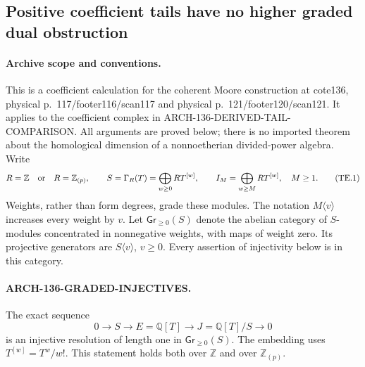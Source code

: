 \subsection{Positive coefficient tails have no higher graded dual obstruction}
\label{arch136:tail-ext}

\paragraph{Archive scope and conventions.}
This is a coefficient calculation for the coherent Moore construction
at cote136, physical p.~117/footer116/scan117 and physical
p.~121/footer120/scan121.  It applies to the coefficient complex in
ARCH-136-DERIVED-TAIL-COMPARISON.  All arguments are proved below;
there is no imported theorem about the homological dimension of a
nonnoetherian divided-power algebra.  Write
\[
 R=\mathbb Z\quad\hbox{or}\quad R=\mathbb Z_{(p)},\qquad
 S=\Gamma_R(T)=\bigoplus_{w\geq0}R T^{[w]},\qquad
 I_M=\bigoplus_{w\geq M}R T^{[w]},\quad M\geq1.
                                                        \tag{TE.1}
\]
Weights, rather than form degrees, grade these modules.  The notation
\(M\langle v\rangle\) increases every weight by \(v\).
Let \(\mathsf{Gr}_{\geq0}(S)\) denote the abelian category of
\(S\)-modules concentrated in nonnegative weights, with maps of
weight zero.  Its projective generators are
\(S\langle v\rangle\), \(v\geq0\).
Every assertion of injectivity below is in this category.

\paragraph{ARCH-136-GRADED-INJECTIVES.}
The exact sequence
\[
 0\longrightarrow S\longrightarrow E=\mathbb Q[T]
       \longrightarrow J=\mathbb Q[T]/S\longrightarrow0
                                                        \tag{TE.2}
\]
is an injective resolution of length one in
\(\mathsf{Gr}_{\geq0}(S)\).  The embedding uses
\(T^{[w]}=T^w/w!\).  This statement holds both over
\(\mathbb Z\) and over \(\mathbb Z_{(p)}\).

